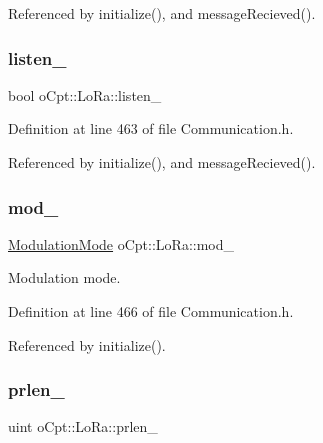 Referenced by initialize(), and message\+Recieved().

\hypertarget{classo_cpt_1_1_lo_ra_a03b9303cbe41d8ad542054359109abd5}{}\label{classo_cpt_1_1_lo_ra_a03b9303cbe41d8ad542054359109abd5} 
\subsubsection{\texorpdfstring{listen\+\_\+}{listen\_}}
{\footnotesize\ttfamily bool o\+Cpt\+::\+Lo\+Ra\+::listen\+\_\+\hspace{0.3cm}{\ttfamily [protected]}}



Definition at line 463 of file Communication.\+h.



Referenced by initialize(), and message\+Recieved().

\hypertarget{classo_cpt_1_1_lo_ra_a98e0dc05a9e45a08afa36beddfe27072}{}\label{classo_cpt_1_1_lo_ra_a98e0dc05a9e45a08afa36beddfe27072} 
\subsubsection{\texorpdfstring{mod\+\_\+}{mod\_}}
{\footnotesize\ttfamily \hyperlink{classo_cpt_1_1_lo_ra_a9791fe69244f3c8af2fd592d2573f939}{Modulation\+Mode} o\+Cpt\+::\+Lo\+Ra\+::mod\+\_\+\hspace{0.3cm}{\ttfamily [protected]}}



Modulation mode. 



Definition at line 466 of file Communication.\+h.



Referenced by initialize().

\hypertarget{classo_cpt_1_1_lo_ra_a93c4923a8c79b33788d998cca5b764f8}{}\label{classo_cpt_1_1_lo_ra_a93c4923a8c79b33788d998cca5b764f8} 
\subsubsection{\texorpdfstring{prlen\+\_\+}{prlen\_}}
{\footnotesize\ttfamily uint o\+Cpt\+::\+Lo\+Ra\+::prlen\+\_\+\hspace{0.3cm}{\ttfamily [protected]}}



